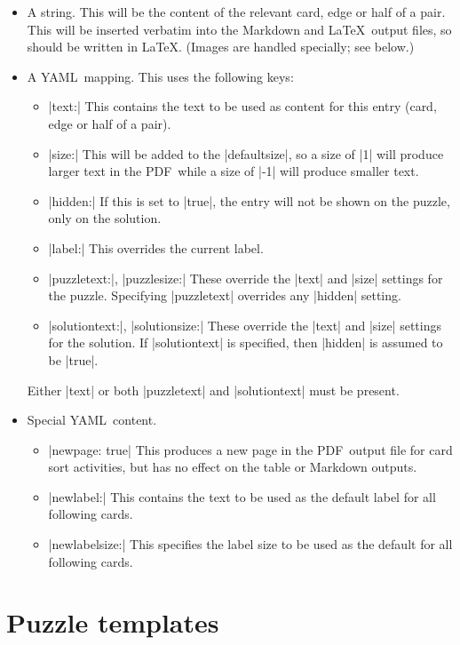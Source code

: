 \documentclass{article}
\def\YAML{{\small YAML}}
\def\PDF{{\small PDF}}
\begin{document}
\begin{itemize}
\item A string.  This will be the content of the relevant card, edge
  or half of a pair.  This will be inserted verbatim into the Markdown
  and \LaTeX\ output files, so should be written in \LaTeX.  (Images
  are handled specially; see below.)
\item A \YAML\ mapping.  This uses the following keys:
  \begin{itemize}
  \item |text:| This contains the text to be used as content for this
    entry (card, edge or half of a pair).
  \item |size:| This will be added to the |defaultsize|, so a size of
    |1| will produce larger text in the \PDF\, while a size of |-1|
    will produce smaller text.
  \item |hidden:| If this is set to |true|, the entry will not be
    shown on the puzzle, only on the solution.
  \item |label:| This overrides the current label.
  \item |puzzletext:|, |puzzlesize:| These override the |text| and
    |size| settings for the puzzle.  Specifying |puzzletext| overrides
    any |hidden| setting.
  \item |solutiontext:|, |solutionsize:| These override the |text| and
    |size| settings for the solution.  If |solutiontext| is specified,
    then |hidden| is assumed to be |true|.
  \end{itemize}
  Either |text| or both |puzzletext| and |solutiontext| must be
  present.

\item Special \YAML\ content.
  \begin{itemize}
  \item |newpage: true| This produces a new page in the \PDF\ output
    file for card sort activities, but has no effect on the table or
    Markdown outputs.
  \item |newlabel:| This contains the text to be used as the default
    label for all following cards.
  \item |newlabelsize:| This specifies the label size to be used as
    the default for all following cards.
  \end{itemize}
\end{itemize}



\section{Puzzle templates}
\label{sec:templates}
\end{document}
